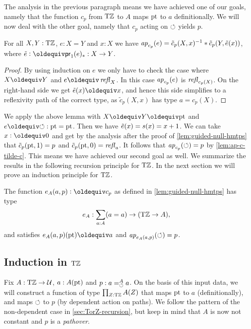 \documentclass[a4,12pt]{amsart}
\begin{document}
The analysis in the previous paragraph
means we have achieved one of our goals,
namely that the function $c_p$ from ${\mathrm{T}\mathbb{Z}}$ to $A$ 
maps ${\mathord{\mathrm{pt}}}$ to $a$ definitionally.
We will now deal with the other goal,
namely that $c_p$ acting on $\circlearrowleft$ yields $p$.

\begin{lemma}\label{lem:ap-c-tilde-c}
For all $X,Y:{\mathrm{T}\mathbb{Z}}$, $e: X=Y$ and $x:X$ we have
$\mathop{{\it ap}_{c_p}}(e) = \tilde c_p(X,x)^{-1}* \tilde c_p(Y,\tilde {e}(x))$,
where $\ptoe{e}\defeq \mathsf{pr}_1(e)_* : X\to Y$.
\end{lemma}
\begin{proof}
By using induction on $e$ we only have to check the case where
$X\jdeq Y$ and $e\jdeq\refl{X}$. In this case $\mathop{{\it ap}_{c_p}}(e)$ is
$\mathop{{\it refl}_{c_p(X)}}$. On the right-hand side we get $\ptoe{e}(x)\jdeq x$,
and hence this side simplifies to a reflexivity path of
the correct type, as $\tilde c_p(X,x)$ has type $a=c_p(X)$.
\end{proof}

We apply the above lemma with $X\jdeq Y\jdeq \pt$ and $e\jdeq{\Zloop}: \pt=\pt$.
Then we have $\tilde {e}(x)=s(x)=x+1$. We can take $x\defeq 0$ and get by
the analysis after the proof of \cref{lem:guided-null-hmtps}
that $\tilde c_p({\mathord{\mathrm{pt}}},1) = p$ and $\tilde c_p({\mathord{\mathrm{pt}}},0) = \mathop{{\it refl}_{a}}$.
It follows that $\mathop{{\it ap}_{c_p}}(\circlearrowleft) = p$ by \cref{lem:ap-c-tilde-c}.
This means we have achieved our second goal as well.
We summarize the results in the following recursion principle for ${\mathrm{T}\mathbb{Z}}$.
In the next section we will prove an induction principle for ${\mathrm{T}\mathbb{Z}}$.

\begin{definition}\label{def:TorZrecursor}
The function $e_A(a,p) \defeq c_p$ as defined in 
\cref{lem:guided-null-hmtps} has type
\[
e_A : \sum_{a:A}(a=a) \to ({\mathrm{T}\mathbb{Z}} \to A),
\]
and satisfies $e_A(a,p)(\pt) \jdeq a$ and 
$\mathop{{\it ap}_{e_A(a,p)}}(\circlearrowleft) = p$.
\end{definition}

\subsection{Induction in ${\mathrm{T}\mathbb{Z}}$}\label{sec:TorZ-induction}

Fix $A:{\mathrm{T}\mathbb{Z}}\to\mathcal{U}$, $a:A({\mathord{\mathrm{pt}}})$ and $p: a=^A_{\circlearrowleft} a$.
On the basis of this input data, we will construct a function of 
type $\prod_{Z:{\mathrm{T}\mathbb{Z}}} A(Z)$ that maps ${\mathord{\mathrm{pt}}}$ to $a$ (definitionally),
and maps $\circlearrowleft$ to $p$ (by dependent action on paths).
We follow the pattern of the non-dependent case
in \cref{sec:TorZ-recursion}, but keep in mind that 
$A$ is now not constant and $p$ is a \emph{pathover}.
\end{document}
